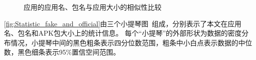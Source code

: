 \begin{figure}[htbp]
    \centering
    \hfill
    \hfill
    \hfill
    \caption{应用的应用名、包名与应用大小的相似性比较}
    \label{fig:Statistic_fake_and_official}
    \vspace{-5mm}
\end{figure}

\autoref{fig:Statistic_fake_and_official}由三个小提琴图~\cite{violinplot}组成，分别表示了本文在应用名、包名和APK包大小上的统计信息。
每个``小提琴''的外部形状为数据的密度分布情况，小提琴中间的黑色粗条表示四分位数范围，粗条中小白点表示数据的中位数，黑色细条表示95\%置信空间范围。

